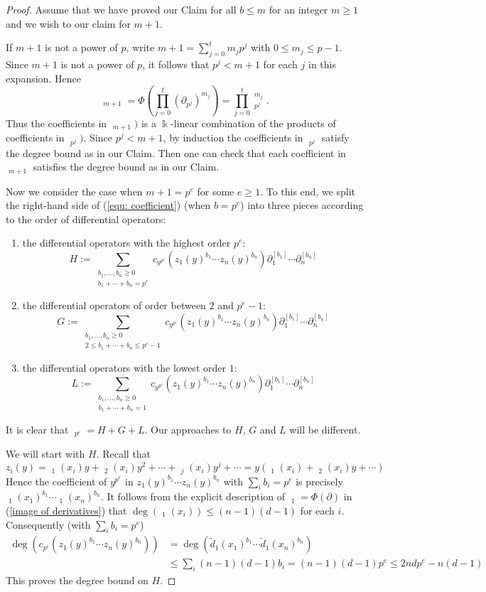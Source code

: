 \documentclass[11pt]{amsart}
\theoremstyle{definition}
\theoremstyle{remark}
\numberwithin{equation}{subsection}
\DeclareMathOperator{\kk}{\Bbbk}
\DeclareMathOperator{\tp}{\tilde{\partial}}
\begin{document}
\begin{proof}
Assume that we have proved our Claim for all $b\leq m$ for an integer $m\geq 1$ and we wish to our claim for $m+1$. 

If $m+1$ is not a power of $p$, write $m+1=\sum_{j=0}^t m_jp^j$ with $0\leq m_j\leq p-1$. Since $m+1$ is not a power of $p$, it follows that $p^j<m+1$ for each $j$ in this expansion. Hence
\[\tp_{m+1}=\Phi(\prod_{j=0}^t (\partial_{p^j})^{m_j})=\prod_{j=0}^t\tp_{p^j}^{m_j}.\] 
Thus the coefficients in $\tp_{m+1})$ is a $\kk$-linear combination of the products of coefficients in $\tp_{p^j})$. Since $p^j<m+1$, by induction the coefficients in $\tp_{p^j}$ satisfy the degree bound as in our Claim. Then one can check that each coefficient in $\tp_{m+1}$ satisfies the degree bound as in our Claim.

Now we consider the case when $m+1=p^e$ for some $e\geq 1$. To this end, we split the right-hand side of (\ref{equ: coefficient}) (when $b=p^e$) into three pieces according to the order of differential operators: 
\begin{enumerate}
\item the differential operators with the highest order $p^e$: 
\[H:=\sum_{\substack{b_1,\dots,b_n\geq 0\\ b_1+\cdots+b_n=p^e}}c_{y^{p^e}}(z_1(y)^{b_1}\cdots z_n(y)^{b_n})\partial^{[b_1]}_1\cdots \partial^{[b_n]}_n\]

\item the differential operators of order between $2$ and $p^e-1$:
\[G:=\sum_{\substack{b_1,\dots,b_n\geq 0\\ 2\leq b_1+\cdots+b_n\leq p^e-1}}c_{y^{p^e}}(z_1(y)^{b_1}\cdots z_n(y)^{b_n})\partial^{[b_1]}_1\cdots \partial^{[b_n]}_n\]

\item the differential operators with the lowest order $1$: 
\[L:=\sum_{\substack{b_1,\dots,b_n\geq 0\\ b_1+\cdots+b_n=1}}c_{y^{p^e}}(z_1(y)^{b_1}\cdots z_n(y)^{b_n})\partial^{[b_1]}_1\cdots \partial^{[b_n]}_n\]

\end{enumerate}
It is clear that $\tp_{p^e}=H+G+L$. Our approaches to $H$, $G$ and $L$ will be different.

We will start with $H$. Recall that 
\[z_i(y)=\tp_{1}(x_i)y+\tp_{2}(x_i)y^2+\cdots+\tp_{j}(x_i)y^j+\cdots=y(\tp_{1}(x_i)+\tp_{2}(x_i)y+\cdots)\]
Hence the coefficient of $y^{p^e}$ in $z_1(y)^{b_1}\cdots z_n(y)^{b_n}$ with $\sum_ib_i=p^e$ is precisely $\tp_{1}(x_1)^{b_1}\cdots \tp_{1}(x_n)^{b_n}$. It follows from the explicit description of $\tp_{1}=\Phi(\partial)$ in (\ref{image of derivatives}) that $\deg(\tp_{1}(x_i))\leq (n-1)(d-1)$ for each $i$. Consequently (with $\sum_ib_i=p^e$)
\begin{align*}
\deg(c_{p^e}(z_1(y)^{b_1}\cdots z_n(y)^{b_n}))&=\deg(\tilde{d}_1(x_1)^{b_1}\cdots \tilde{d}_1(x_n)^{b_n})\\
&\leq \sum_i(n-1)(d-1)b_i=(n-1)(d-1)p^e\leq 2ndp^e-n(d-1)
\end{align*}
This proves the degree bound on $H$.


\end{proof}
\end{document}

